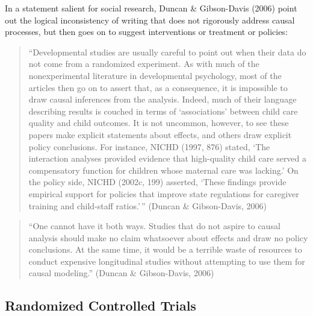 \documentclass[
  letterpaper,
  DIV=11,
  numbers=noendperiod]{scrreprt}
\begin{document}
In a statement salient for social research, Duncan \& Gibson-Davis
(2006) point out the logical inconsistency of writing that does not
rigorously address causal processes, but then goes on to suggest
interventions or treatment or policies:

\begin{quote}
``Developmental studies are usually careful to point out when their data
do not come from a randomized experiment. As with much of the
nonexperimental literature in developmental psychology, most of the
articles then go on to assert that, as a consequence, it is impossible
to draw causal inferences from the analysis. Indeed, much of their
language describing results is couched in terms of `associations'
between child care quality and child outcomes. It is not uncommon,
however, to see these papers make explicit statements about effects, and
others draw explicit policy conclusions. For instance, NICHD (1997, 876)
stated, `The interaction analyses provided evidence that high-quality
child care served a compensatory function for children whose maternal
care was lacking.' On the policy side, NICHD (2002c, 199) asserted,
`These findings provide empirical support for policies that improve
state regulations for caregiver training and child-staff ratios.'\,''
(Duncan \& Gibson-Davis, 2006)
\end{quote}

\begin{quote}
``One cannot have it both ways. Studies that do not aspire to causal
analysis should make no claim whatsoever about effects and draw no
policy conclusions. At the same time, it would be a terrible waste of
resources to conduct expensive longitudinal studies without attempting
to use them for causal modeling.'' (Duncan \& Gibson-Davis, 2006)
\end{quote}

\subsection{Randomized Controlled
Trials}\label{randomized-controlled-trials}
\end{document}

